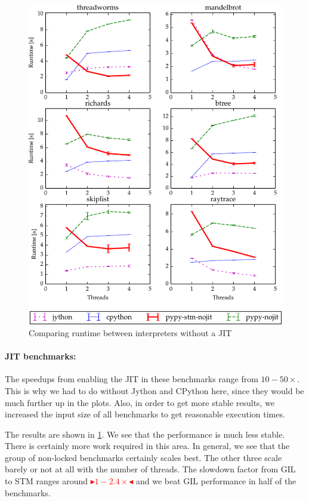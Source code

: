 \documentclass{sigplanconf}
\newcommand{\mynote}[2]{%
  \textcolor{red}{%
    \fbox{\bfseries\sffamily\scriptsize#1}%
    {\small$\blacktriangleright$\textsf{\emph{#2}}$\blacktriangleleft$}%
  }%
}
\newcommand\remi[1]{\mynote{Remi}{#1}}
\begin{document}
\begin{figure}[h]
  \centering
  \includegraphics[width=1\columnwidth]{plots/performance_nojit.pdf}
  \caption{Comparing runtime between interpreters without a JIT\label{fig:performance-nojit}}
\end{figure}


\paragraph{JIT benchmarks:} The speedups from enabling the JIT in
these benchmarks range from $10-50\times$. This is why we had to do
without Jython and CPython here, since they would be much further up
in the plots. Also, in order to get more stable results, we increased
the input size of all benchmarks to get reasonable execution times.

The results are shown in \ref{fig:performance-nojit}. We see that the
performance is much less stable. There is certainly more work required
in this area. In general, we see that the group of non-locked
benchmarks certainly scales best. The other three scale barely or not
at all with the number of threads. The slowdown factor from GIL to STM
ranges around \remi{$1-2.4\times$} and we beat GIL performance in half
of the benchmarks.
\end{document}

